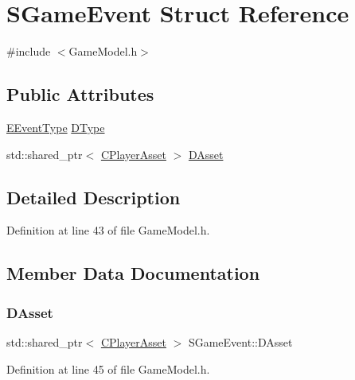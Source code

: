 \hypertarget{structSGameEvent}{}\section{S\+Game\+Event Struct Reference}
\label{structSGameEvent}


{\ttfamily \#include $<$Game\+Model.\+h$>$}

\subsection*{Public Attributes}
\begin{DoxyCompactItemize}
\item 
\hyperlink{GameModel_8h_abfcf510bafec7c6429906a6ecaac656d}{E\+Event\+Type} \hyperlink{structSGameEvent_afa10562e243f4ac2b473b655cc58fee7}{D\+Type}
\item 
std\+::shared\+\_\+ptr$<$ \hyperlink{classCPlayerAsset}{C\+Player\+Asset} $>$ \hyperlink{structSGameEvent_a40c85eeac83b96887b7449c9bdc5d624}{D\+Asset}
\end{DoxyCompactItemize}


\subsection{Detailed Description}


Definition at line 43 of file Game\+Model.\+h.



\subsection{Member Data Documentation}
\hypertarget{structSGameEvent_a40c85eeac83b96887b7449c9bdc5d624}{}\label{structSGameEvent_a40c85eeac83b96887b7449c9bdc5d624} 
\subsubsection{\texorpdfstring{D\+Asset}{DAsset}}
{\footnotesize\ttfamily std\+::shared\+\_\+ptr$<$ \hyperlink{classCPlayerAsset}{C\+Player\+Asset} $>$ S\+Game\+Event\+::\+D\+Asset}



Definition at line 45 of file Game\+Model.\+h.




